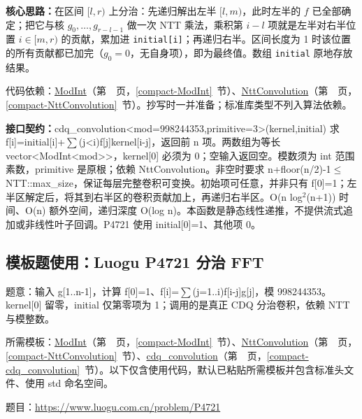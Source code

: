 \textbf{核心思路：}\allowbreak 在区间 $[l,r)$ 上分治：先递归解出左半 $[l,m)$，此时左半的 $f$ 已全部确定；把它与核 $g_0,\dots,g_{r-l-1}$ 做一次 NTT 乘法，乘积第 $i-l$ 项就是左半对右半位置 $i\in[m,r)$ 的贡献，累加进 \texttt{initial[i]}；再递归右半。区间长度为 1 时该位置的所有贡献都已加完（$g_0=0$，无自身项），即为最终值。数组 \texttt{initial} 原地存放结果。

代码依赖：\hyperref[compact-ModInt]{ModInt}（第~\pageref{compact-ModInt}~页，\ref{compact-ModInt}~节）、\hyperref[compact-NttConvolution]{NttConvolution}（第~\pageref{compact-NttConvolution}~页，\ref{compact-NttConvolution}~节）。抄写时一并准备；标准库类型不列入算法依赖。

{\sloppy{}\noindent\textbf{接口契约：}cdq\_convolution<mod=998244353,primitive=3>(kernel,initial) 求 f[i]=initial[i]+$\sum$(j<i)f[j]kernel[i-j]，返回前 n 项。两数组为等长 vector<ModInt<mod>>，kernel[0] 必须为 0；空输入返回空。模数须为 int 范围素数，primitive 是原根；依赖 NttConvolution。非空时要求 n+floor(n/2)-1$\le$NTT::max\_size，保证每层完整卷积可变换。初始项可任意，并非只有 f[0]=1；左半区解定后，将其到右半区的卷积贡献加上，再递归右半区。O(n log$^{2}$(n+1)) 时间、O(n) 额外空间，递归深度 O(log n)。本函数是静态线性递推，不提供流式追加或非线性叶子回调。P4721 使用 initial[0]=1、其他项 0。\par}



\Needspace{377pt}

\subsection*{模板题使用：Luogu P4721 分治 FFT}

\label{usage-example-115}

题意：输入 g[1..n-1]，计算 f[0]=1、f[i]=$\sum$(j=1..i)f[i-j]g[j]，模 998244353。kernel[0] 留零，initial 仅第零项为 1；调用的是真正 CDQ 分治卷积，依赖 NTT 与模整数。

所需模板：\hyperref[compact-ModInt]{ModInt}（第~\pageref{compact-ModInt}~页，\ref{compact-ModInt}~节）、\hyperref[compact-NttConvolution]{NttConvolution}（第~\pageref{compact-NttConvolution}~页，\ref{compact-NttConvolution}~节）、\hyperref[compact-cdq_convolution]{cdq\_\allowbreak{}convolution}（第~\pageref{compact-cdq_convolution}~页，\ref{compact-cdq_convolution}~节）。以下仅含使用代码，默认已粘贴所需模板并包含标准头文件、使用 std 命名空间。

题目：\url{https://www.luogu.com.cn/problem/P4721}

